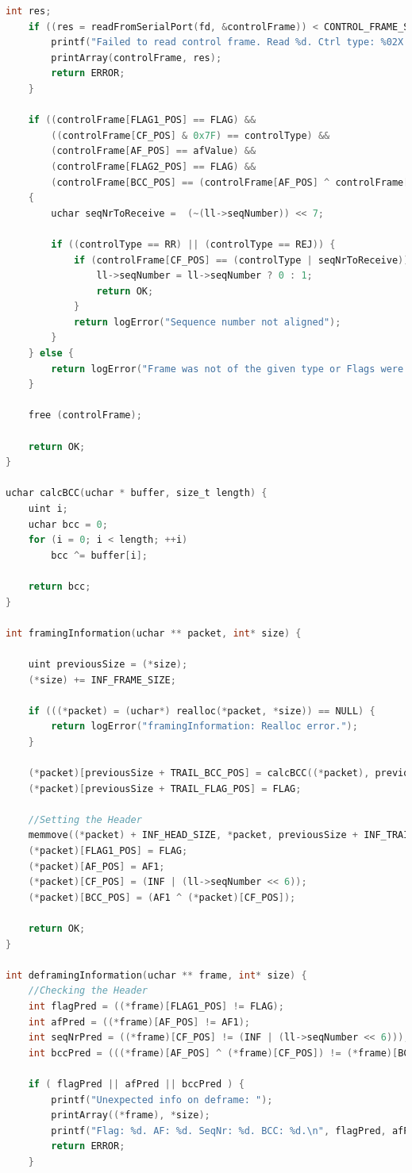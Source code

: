 \documentclass[a4paper, 11pt]{article}
\begin{document}
\begin{lstlisting}[language=C]
	int res;
	if ((res = readFromSerialPort(fd, &controlFrame)) < CONTROL_FRAME_SIZE) {
		printf("Failed to read control frame. Read %d. Ctrl type: %02X -- ", res, controlType);
		printArray(controlFrame, res);
		return ERROR;
	}

	if ((controlFrame[FLAG1_POS] == FLAG) &&
		((controlFrame[CF_POS] & 0x7F) == controlType) &&
		(controlFrame[AF_POS] == afValue) &&
		(controlFrame[FLAG2_POS] == FLAG) &&
		(controlFrame[BCC_POS] == (controlFrame[AF_POS] ^ controlFrame[CF_POS])))
	{
		uchar seqNrToReceive =  (~(ll->seqNumber)) << 7;

		if ((controlType == RR) || (controlType == REJ)) {
			if (controlFrame[CF_POS] == (controlType | seqNrToReceive)) {
				ll->seqNumber = ll->seqNumber ? 0 : 1;
				return OK;
			}
			return logError("Sequence number not aligned");
		}
	} else {
		return logError("Frame was not of the given type or Flags were not recognized");
	}

	free (controlFrame);

	return OK;
}

uchar calcBCC(uchar * buffer, size_t length) {
	uint i;
	uchar bcc = 0;
	for (i = 0; i < length; ++i)
		bcc ^= buffer[i];

	return bcc;
}

int framingInformation(uchar ** packet, int* size) {

	uint previousSize = (*size);
	(*size) += INF_FRAME_SIZE;

	if (((*packet) = (uchar*) realloc(*packet, *size)) == NULL) {
		return logError("framingInformation: Realloc error.");
	}

	(*packet)[previousSize + TRAIL_BCC_POS] = calcBCC((*packet), previousSize);
	(*packet)[previousSize + TRAIL_FLAG_POS] = FLAG;

	//Setting the Header
	memmove((*packet) + INF_HEAD_SIZE, *packet, previousSize + INF_TRAILER_SIZE);
	(*packet)[FLAG1_POS] = FLAG;
	(*packet)[AF_POS] = AF1;
	(*packet)[CF_POS] = (INF | (ll->seqNumber << 6));
	(*packet)[BCC_POS] = (AF1 ^ (*packet)[CF_POS]);

	return OK;
}

int deframingInformation(uchar ** frame, int* size) {
	//Checking the Header
	int flagPred = ((*frame)[FLAG1_POS] != FLAG);
	int afPred = ((*frame)[AF_POS] != AF1);
	int seqNrPred = ((*frame)[CF_POS] != (INF | (ll->seqNumber << 6)));
	int bccPred = (((*frame)[AF_POS] ^ (*frame)[CF_POS]) != (*frame)[BCC_POS]);

	if ( flagPred || afPred || bccPred ) {
		printf("Unexpected info on deframe: ");
		printArray((*frame), *size);
		printf("Flag: %d. AF: %d. SeqNr: %d. BCC: %d.\n", flagPred, afPred, seqNrPred, bccPred);
		return ERROR;
	}


\end{lstlisting}
\end{document}

